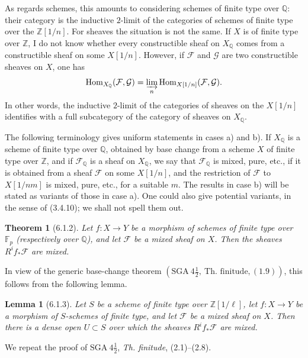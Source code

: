 \documentclass[11pt]{article}
\newtheorem{theorem}{Theorem}
\newtheorem{lemma}{Lemma}
\theoremstyle{remark}
\newcommand{\ZZ}{\mathbb{Z}}
\newcommand{\QQ}{\mathbb{Q}}
\begin{document}
As regards schemes, this amounts to considering schemes of finite type over \(\QQ\): their category is the inductive \(2\)-limit of the categories of schemes of finite type over the \(\ZZ[1/n]\).  For sheaves the situation is not the same.  If \(X\) is of finite type over \(\ZZ\), I do not know whether every constructible sheaf on \(X_{\QQ}\) comes from a constructible sheaf on some \(X[1/n]\).  However, if \(\mathcal F\) and \(\mathcal G\) are two constructible sheaves on \(X\), one has
\[
\operatorname{Hom}_{X_{\QQ}}(\mathcal F,\mathcal G)
 =\varinjlim_n \operatorname{Hom}_{X[1/n]}(\mathcal F,\mathcal G).
\]
In other words, the inductive \(2\)-limit of the categories of sheaves on the \(X[1/n]\) identifies with a full subcategory of the category of sheaves on \(X_{\QQ}\).

The following terminology gives uniform statements in cases a) and b).  If \(X_{\QQ}\) is a scheme of finite type over \(\QQ\), obtained by base change from a scheme \(X\) of finite type over \(\ZZ\), and if \(\mathcal F_{\QQ}\) is a sheaf on \(X_{\QQ}\), we say that \(\mathcal F_{\QQ}\) is mixed, pure, etc., if it is obtained from a sheaf \(\mathcal F\) on some \(X[1/n]\), and the restriction of \(\mathcal F\) to \(X[1/nm]\) is mixed, pure, etc., for a suitable \(m\).  The results in case b) will be stated as variants of those in case a).  One could also give potential variants, in the sense of (3.4.10); we shall not spell them out.

\begin{theorem}[6.1.2]
Let \(f:X\to Y\) be a morphism of schemes of finite type over \(\mathbb F_p\) (respectively over \(\QQ\)), and let \(\mathcal F\) be a mixed sheaf on \(X\).  Then the sheaves \(R^if_*\mathcal F\) are mixed.
\end{theorem}

In view of the generic base-change theorem \((\mathrm{SGA}\ 4\tfrac12,\ \text{Th. finitude}, (1.9))\), this follows from the following lemma.

\begin{lemma}[6.1.3]
Let \(S\) be a scheme of finite type over \(\ZZ[1/\ell]\), let \(f:X\to Y\) be a morphism of \(S\)-schemes of finite type, and let \(\mathcal F\) be a mixed sheaf on \(X\).  Then there is a dense open \(U\subset S\) over which the sheaves \(R^if_*\mathcal F\) are mixed.
\end{lemma}

We repeat the proof of \(\mathrm{SGA}\ 4\tfrac12\), \emph{Th. finitude}, (2.1)--(2.8).
\end{document}
